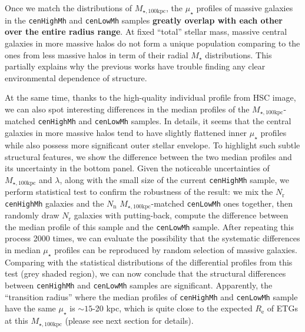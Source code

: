 \documentclass{emulateapj}
\def\rbcg{\texttt{cenHighMh}}
\def\nbcg{\texttt{cenLowMh}}
\def\mstar{{$M_{\star}$}}
\def\mtot{{$M_{\star,100\mathrm{kpc}}$}}
\def\mden{{$\mu_{\star}$}}
\newcommand{\update}[1]{\textcolor{Bittersweet}{#1}}
\begin{document}
\begin{CJK*}{UTF8}{gbsn}
    Once we match the distributions of \mtot{}, the \mden{} profiles of massive 
    galaxies in the \rbcg{} and \nbcg{} samples \textbf{greatly overlap with each 
    other over the entire radius range}. 
    At fixed ``total'' stellar mass, massive central galaxies in more massive 
    halos do not form a unique population comparing to the ones from less massive 
    halos in term of their radial \mstar{} distributions. 
    \update{
    This partially explains why the previous works have trouble finding any clear 
    environmental dependence of structure.} 
    
    At the same time, thanks to the high-quality individual profile from HSC image, 
    we can also spot interesting differences in the median profiles of the 
    \mtot{}-matched \rbcg{} and \nbcg{} samples.  
    In details, it seems that the central galaxies in more massive halos tend to 
    have slightly flattened inner \mden{} profiles while also possess more significant 
    outer stellar envelope.   
    To highlight such subtle structural features, we show the difference between 
    the two median profiles and its uncertainty in the bottom panel. 
    Given the noticeable uncertainties of \mtot{} and $\lambda$, along with the 
    small size of the current \rbcg{} sample, we perform statistical test to confirm 
    the robustness of the result: we mix the $N_{\mathrm{r}}$ \rbcg{} galaxies and 
    the $N_{\mathrm{n}}$ \mtot{}-matched \nbcg{} ones together, then randomly draw 
    $N_{\mathrm{r}}$ galaxies with putting-back, compute the difference between the 
    median profile of this sample and the \nbcg{} sample. 
    \update{
    After repeating this process 2000 times, we can evaluate the possibility that 
    the systematic differences in median \mden{} profiles can be reproduced by random 
    selection of massive galaxies.
    Comparing with the statistical distributions of the differential profiles from 
    this test (grey shaded region), we can now conclude that the structural 
    differences between \rbcg{} and \nbcg{} samples are significant.}
    Apparently, the ``transition radius'' where the median profiles of \rbcg{} 
    and \nbcg{} sample have the same \mden{} is $\sim 15$-20 kpc, which is quite 
    close to the expected $R_{\mathrm{e}}$ of ETGs at this \mtot{} (please see 
    next section for details).
       

\end{CJK*}
\end{document}
